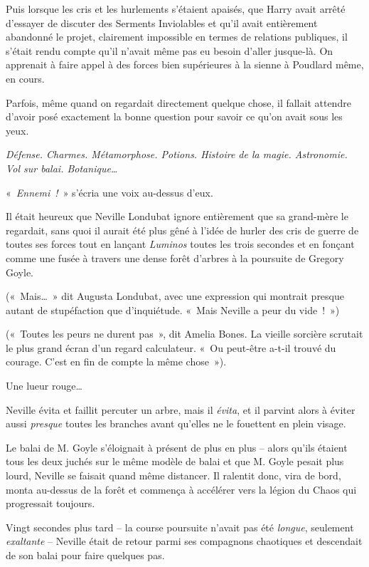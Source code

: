 Puis lorsque les cris et les hurlements s'étaient apaisés, que Harry avait arrêté d'essayer de discuter des Serments Inviolables et qu'il avait entièrement abandonné le projet, clairement impossible en termes de relations publiques, il s'était rendu compte qu'il n'avait même pas eu besoin d'aller jusque-là.
On apprenait à faire appel à des forces bien supérieures à la sienne à Poudlard même, en cours.

Parfois, même quand on regardait directement quelque chose, il fallait attendre d'avoir posé exactement la bonne question pour savoir ce qu'on avait sous les yeux.

\emph{Défense.
Charmes.
Métamorphose.
Potions.
Histoire de la magie.
Astronomie.
Vol sur balai.
Botanique…}

«~\emph{Ennemi~!}~» s'écria une voix au-dessus d'eux.

\later

Il était heureux que Neville Londubat ignore entièrement que sa grand-mère le regardait, sans quoi il aurait été plus gêné à l'idée de hurler des cris de guerre de toutes ses forces tout en lançant \emph{Luminos} toutes les trois secondes et en fonçant comme une fusée à travers une dense forêt d'arbres à la poursuite de Gregory Goyle.

(«~Mais…~»
dit Augusta Londubat, avec une expression qui montrait presque autant de stupéfaction que d'inquiétude.
«~Mais Neville a peur du vide~!~»)

(«~Toutes les peurs ne durent pas~», dit Amelia Bones.
La vieille sorcière scrutait le plus grand écran d'un regard calculateur.
«~Ou peut-être a-t-il trouvé du courage.
C'est en fin de compte la même chose~»).

Une lueur rouge…

Neville évita et faillit percuter un arbre, mais il \emph{évita}, et il parvint alors à éviter aussi \emph{presque} toutes les branches avant qu'elles ne le fouettent en plein visage.

Le balai de M. Goyle s'éloignait à présent de plus en plus -- alors qu'ils étaient tous les deux juchés sur le même modèle de balai et que M. Goyle pesait plus lourd, Neville se faisait quand même distancer.
Il ralentit donc, vira de bord, monta au-dessus de la forêt et commença à accélérer vers la légion du Chaos qui progressait toujours.

Vingt secondes plus tard -- la course poursuite n'avait pas été \emph{longue}, seulement \emph{exaltante} -- Neville était de retour parmi ses compagnons chaotiques et descendait de son balai pour faire quelques pas.

